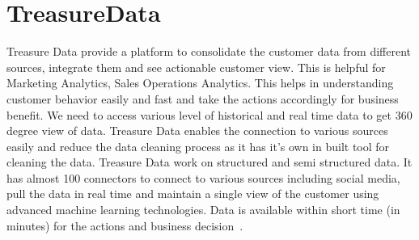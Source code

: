 \section{TreasureData}

Treasure Data provide a platform to consolidate the customer data from
different sources, integrate them and see actionable customer view.
This is helpful for Marketing Analytics, Sales Operations Analytics.
This helps in understanding customer behavior easily and fast and take
the actions accordingly for business benefit. We need to access
various level of historical and real time data to get 360 degree view
of data. Treasure Data enables the connection to various sources
easily and reduce the data cleaning process as it
has it's own in built tool for cleaning the data. Treasure Data work
on structured and semi structured data. It has almost 100 connectors
to connect to various sources including social media, pull the data in
real time and maintain a single view of the customer using advanced
machine learning technologies. Data is available within short time (in
minutes) for the actions and business
decision~\cite{hid-sp18-511-treasuredata}.
